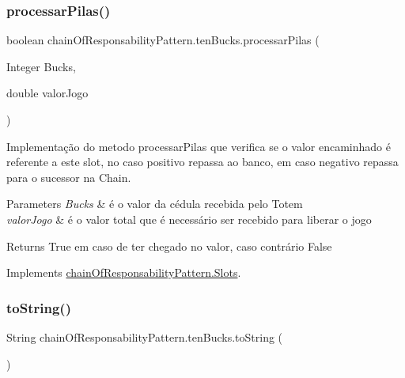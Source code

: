 \subsubsection{\texorpdfstring{processarPilas()}{processarPilas()}}
{\footnotesize\ttfamily boolean chain\+Of\+Responsability\+Pattern.\+ten\+Bucks.\+processar\+Pilas (\begin{DoxyParamCaption}\item[{Integer}]{Bucks,  }\item[{double}]{valor\+Jogo }\end{DoxyParamCaption})}



Implementação do metodo processar\+Pilas que verifica se o valor encaminhado é referente a este slot, no caso positivo repassa ao banco, em caso negativo repassa para o sucessor na Chain. 


\begin{DoxyParams}{Parameters}
{\em Bucks} & é o valor da cédula recebida pelo Totem \\
\hline
{\em valor\+Jogo} & é o valor total que é necessário ser recebido para liberar o jogo \\
\hline
\end{DoxyParams}
\begin{DoxyReturn}{Returns}
True em caso de ter chegado no valor, caso contrário False 
\end{DoxyReturn}


Implements \mbox{\hyperlink{interfacechain_of_responsability_pattern_1_1_slots_ade54039583c4faf4126847fe7c143862}{chain\+Of\+Responsability\+Pattern.\+Slots}}.

\mbox{\label{classchain_of_responsability_pattern_1_1ten_bucks_adad988c7fd20a4e9bee2af9769f8164f}} 
\subsubsection{\texorpdfstring{toString()}{toString()}}
{\footnotesize\ttfamily String chain\+Of\+Responsability\+Pattern.\+ten\+Bucks.\+to\+String (\begin{DoxyParamCaption}{ }\end{DoxyParamCaption})}



